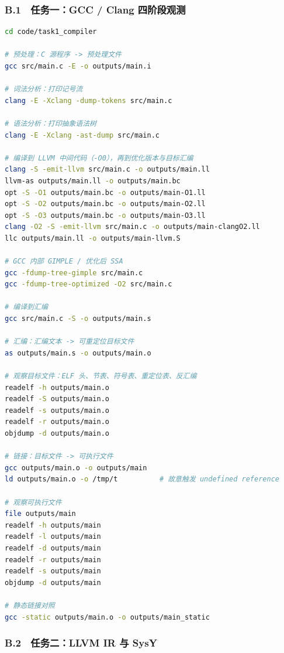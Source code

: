 \documentclass[UTF8,a4paper,10pt]{ctexart}
\begin{document}
\subsubsection{B.1　任务一：GCC / Clang 四阶段观测}


\begin{lstlisting}[language=bash]
cd code/task1_compiler

# 预处理：C 源程序 -> 预处理文件
gcc src/main.c -E -o outputs/main.i

# 词法分析：打印记号流
clang -E -Xclang -dump-tokens src/main.c

# 语法分析：打印抽象语法树
clang -E -Xclang -ast-dump src/main.c

# 编译到 LLVM 中间代码（-O0），再到优化版本与目标汇编
clang -S -emit-llvm src/main.c -o outputs/main.ll
llvm-as outputs/main.ll -o outputs/main.bc
opt -S -O1 outputs/main.bc -o outputs/main-O1.ll
opt -S -O2 outputs/main.bc -o outputs/main-O2.ll
opt -S -O3 outputs/main.bc -o outputs/main-O3.ll
clang -O2 -S -emit-llvm src/main.c -o outputs/main-clangO2.ll
llc outputs/main.ll -o outputs/main-llvm.S

# GCC 内部 GIMPLE / 优化后 SSA
gcc -fdump-tree-gimple src/main.c
gcc -fdump-tree-optimized -O2 src/main.c

# 编译到汇编
gcc src/main.c -S -o outputs/main.s

# 汇编：汇编文本 -> 可重定位目标文件
as outputs/main.s -o outputs/main.o

# 观察目标文件：ELF 头、节表、符号表、重定位表、反汇编
readelf -h outputs/main.o
readelf -S outputs/main.o
readelf -s outputs/main.o
readelf -r outputs/main.o
objdump -d outputs/main.o

# 链接：目标文件 -> 可执行文件
gcc outputs/main.o -o outputs/main
ld outputs/main.o -o /tmp/t          # 故意触发 undefined reference

# 观察可执行文件
file outputs/main
readelf -h outputs/main
readelf -l outputs/main
readelf -d outputs/main
readelf -r outputs/main
readelf -s outputs/main
objdump -d outputs/main

# 静态链接对照
gcc -static outputs/main.o -o outputs/main_static\end{lstlisting}


\subsubsection{B.2　任务二：LLVM IR 与 SysY}
\end{document}
